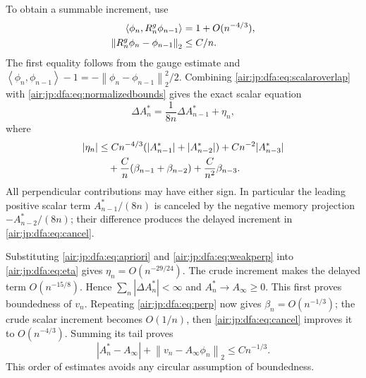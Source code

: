 \documentclass[11pt,letterpaper]{article}
\numberwithin{equation}{section}
\theoremstyle{remark}
\newcommand{\ip}[2]{\left\langle#1,#2\right\rangle}
\newcommand{\normtwo}[1]{\left\lVert#1\right\rVert_2}
\begin{document}
To obtain a summable increment, use
\begin{align}
 \ip{\phi_n}{R_n^g\phi_{n-1}}&=1+O(n^{-4/3}),\label{air:jp:dfa:eq:scalaroverlap}\\
 \normtwo{R_n^g\phi_n-\phi_{n-1}}&\le C/n.\notag
\end{align}
The first equality follows from the gauge estimate and
$\ip{\phi_n}{\phi_{n-1}}-1=-\normtwo{\phi_n-\phi_{n-1}}^2/2$.
Combining \eqref{air:jp:dfa:eq:scalaroverlap} with \eqref{air:jp:dfa:eq:normalizedbounds} gives the exact scalar equation
\begin{equation}\label{air:jp:dfa:eq:cancel}
 \Delta A_n^*=\frac1{8n}\Delta A_{n-1}^*+\eta_n,
\end{equation}
where
\begin{align}
 |\eta_n|&\le Cn^{-4/3}(|A_{n-1}^*|+|A_{n-2}^*|)
       +Cn^{-2}|A_{n-3}^*|\notag\\
 &\quad+\frac Cn(\beta_{n-1}+\beta_{n-2})+\frac C{n^2}\beta_{n-3}.\label{air:jp:dfa:eq:eta}
\end{align}
All perpendicular contributions may have either sign. In particular the leading positive scalar term $A_{n-1}^*/(8n)$ is canceled by the negative memory projection $-A_{n-2}^*/(8n)$; their difference produces the delayed increment in \eqref{air:jp:dfa:eq:cancel}.

Substituting \eqref{air:jp:dfa:eq:apriori} and \eqref{air:jp:dfa:eq:weakperp} into \eqref{air:jp:dfa:eq:eta} gives $\eta_n=O(n^{-29/24})$. The crude increment makes the delayed term $O(n^{-15/8})$. Hence $\sum_n|\Delta A_n^*|<\infty$ and $A_n^*\to A_\infty\ge0$. This first proves boundedness of $v_n$. Repeating \eqref{air:jp:dfa:eq:perp} now gives $\beta_n=O(n^{-1/3})$; the crude scalar increment becomes $O(1/n)$, then \eqref{air:jp:dfa:eq:cancel} improves it to $O(n^{-4/3})$. Summing its tail proves
\begin{equation}\label{air:jp:dfa:eq:profilelimit}
 |A_n^*-A_\infty|+\normtwo{v_n-A_\infty\phi_n}\le Cn^{-1/3}.
\end{equation}
This order of estimates avoids any circular assumption of boundedness.
\end{document}
